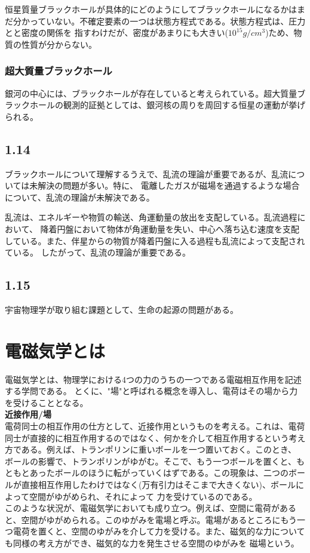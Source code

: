 \documentclass[a4paper,11pt]{jsarticle}
\numberwithin{equation}{section}
\begin{document}
恒星質量ブラックホールが具体的にどのようにしてブラックホールになるかはまだ分かっていない。不確定要素の一つは状態方程式である。状態方程式は、圧力とと密度の関係を
指すわけだが、密度があまりにも大きい($10^15g/cm^3$)ため、物質の性質が分からない。

\subsubsection{超大質量ブラックホール}
銀河の中心には、ブラックホールが存在していると考えられている。超大質量ブラックホールの観測的証拠としては、銀河核の周りを周回する恒星の運動が挙げられる。

\subsection{1.14}
ブラックホールについて理解するうえで、乱流の理論が重要であるが、乱流については未解決の問題が多い。特に、
電離したガスが磁場を通過するような場合について、乱流の理論が未解決である。

乱流は、エネルギーや物質の輸送、角運動量の放出を支配している。乱流過程において、
降着円盤において物体が角運動量を失い、中心へ落ち込む速度を支配している。また、伴星からの物質が降着円盤に入る過程も乱流によって支配されている。
したがって、乱流の理論が重要である。

\subsection{1.15}
宇宙物理学が取り組む課題として、生命の起源の問題がある。

\newpage

\section{電磁気学とは}
電磁気学とは、物理学における4つの力のうちの一つである電磁相互作用を記述する学問である。
とくに、"場"と呼ばれる概念を導入し、電荷はその場から力を受けることとなる。\\

\textbf{近接作用/場}\\
電荷同士の相互作用の仕方として、近接作用というものを考える。これは、電荷同士が直接的に相互作用するのではなく、何かを介して相互作用するという考え方である。例えば、トランポリンに重いボールを一つ置いておく。このとき、
ボールの影響で、トランポリンがゆがむ。そこで、もう一つボールを置くと、もともとあったボールのほうに転がっていくはずである。この現象は、二つのボールが直接相互作用したわけではなく(万有引力はそこまで大きくない)、ボールによって空間がゆがめられ、それによって
力を受けているのである。\\
このような状況が、電磁気学においても成り立つ。例えば、空間に電荷があると、空間がゆがめられる。このゆがみを電場と呼ぶ。電場があるところにもう一つ電荷を置くと、空間のゆがみを介して力を受ける。また、磁気的な力についても同様の考え方ができ、磁気的な力を発生させる空間のゆがみを
磁場という。\\
\end{document}
